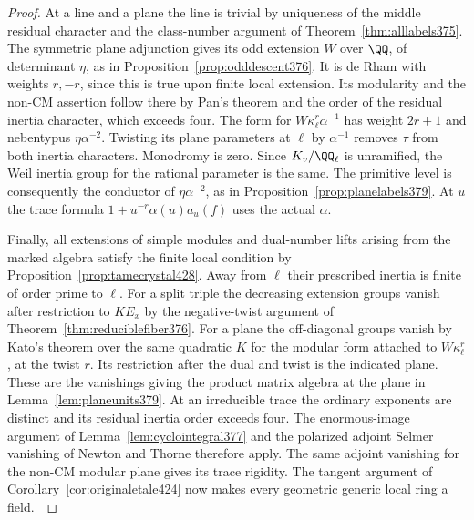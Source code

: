 \documentclass[a4paper,11pt]{article}
\theoremstyle{definition}
\theoremstyle{remark}
\numberwithin{equation}{section}
\begin{document}
\begin{proof}
At a line and a plane the line is trivial by uniqueness of
the middle residual character and the class-number argument
of Theorem~\ref{thm:alllabels375}. The symmetric plane
adjunction gives its odd extension \(W\) over \(\QQ\),
of determinant \(\eta\), as in Proposition~\ref{prop:odddescent376}.
It is de Rham with weights \(r,-r\), since this is true upon
finite local extension. Its modularity and the non-CM
assertion follow there by Pan's theorem and the order of
the residual inertia character, which exceeds four. The form
for \(W\kappa_\ell^r\alpha^{-1}\) has weight \(2r+1\) and
nebentypus \(\eta\alpha^{-2}\). Twisting its plane parameters
at \(\ell\) by \(\alpha^{-1}\) removes \(\tau\) from both
inertia characters. Monodromy is zero. Since \(K_v/\QQ_\ell\)
is unramified, the Weil inertia group for the rational
parameter is the same. The primitive level is consequently
the conductor of \(\eta\alpha^{-2}\), as in
Proposition~\ref{prop:planelabels379}. At \(u\) the trace
formula \(1+u^{-r}\alpha(u)a_u(f)\) uses the actual \(\alpha\).
~\cite{XI-VIII-VI-pan40,XI-VIII-VI-saito40}

Finally, all extensions of simple modules and dual-number
lifts arising from the marked algebra satisfy the finite
local condition by Proposition~\ref{prop:tamecrystal428}.
Away from \(\ell\) their prescribed inertia is finite of
order prime to \(\ell\). For a split triple the decreasing
extension groups vanish after restriction to \(K E_x\) by
the negative-twist argument of Theorem~\ref{thm:reduciblefiber376}.
For a plane the off-diagonal groups vanish by Kato's theorem
over the same quadratic \(K\) for the modular form attached
to \(W\kappa_\ell^r\), at the twist \(r\). Its restriction
after the dual and twist is the indicated plane. These are
the vanishings giving the product matrix algebra at the plane
in Lemma~\ref{lem:planeunits379}. At an irreducible trace
the ordinary exponents are distinct and its residual inertia
order exceeds four. The enormous-image argument of
Lemma~\ref{lem:cyclointegral377} and the polarized adjoint
Selmer vanishing of Newton and Thorne therefore apply. The
same adjoint vanishing for the non-CM modular plane gives
its trace rigidity. The tangent argument of
Corollary~\ref{cor:originaletale424} now makes every
geometric generic local ring a field.~\cite{XI-VIII-VI-kato120,XI-VIII-VI-nt119}
\end{proof}
\end{document}
